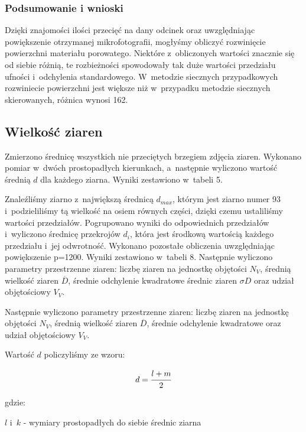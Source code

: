 \documentclass[a4paper,12pt]{article}
\begin{document}
\newpage
{\color{purple}
\subsubsection{Podsumowanie i wnioski}



Dzięki znajomości ilości przecięć na dany odcinek oraz uwzględniając powiększenie otrzymanej mikrofotografii, mogłyśmy obliczyć rozwinięcie powierzchni materiału porowatego. Niektóre z~obliczonych wartości znacznie się od siebie różnią, te rozbieżności spowodowały tak duże wartości przedziału ufności i~odchylenia standardowego.{\color{blue} W~metodzie siecznych przypadkowych rozwiniecie powierzchni jest większe niż w~przypadku metodzie siecznych skierowanych, różnica wynosi 162.}}
\newpage

\subsection{Wielkość ziaren}

Zmierzono średnicę wszystkich nie przeciętych brzegiem zdjęcia ziaren. Wykonano pomiar w~dwóch prostopadłych kierunkach, a~następnie wyliczono wartość średnią $d$ dla każdego ziarna. Wyniki zestawiono w~tabeli 5.

Znaleźliśmy ziarno z~największą średnicą $d_{max}$, którym jest ziarno numer 93 i~podzieliliśmy tą wielkość na osiem równych części, dzięki czemu ustaliliśmy wartości przedziałów. Pogrupowano wyniki do odpowiednich przedziałów i~wyliczono średnicę przekrojów $d_i$, która jest środkową wartością każdego przedziału i~jej odwrotność. Wykonano pozostałe obliczenia uwzględniając powiększenie p=1200. Wyniki zestawiono w~tabeli 8.
Następnie wyliczono parametry przestrzenne ziaren: liczbę ziaren na jednostkę objętości $N_V$, średnią wielkość ziaren $\overline{D}$, średnie odchylenie kwadratowe średnic ziaren $\sigma D$ oraz udział objętościowy $V_V$.

Następnie wyliczono parametry przestrzenne ziaren: liczbę ziaren na jednostkę objętości $N_V$, średnią wielkość ziaren $\overline{D}$, średnie odchylenie kwadratowe oraz udział objętościowy $V_V$.

Wartość $d$ policzyliśmy ze wzoru:

$$d=\cfrac{l+m}{2}$$

gdzie:

$l$ i~$k$ - wymiary prostopadłych do siebie średnic ziarna
\end{document}
